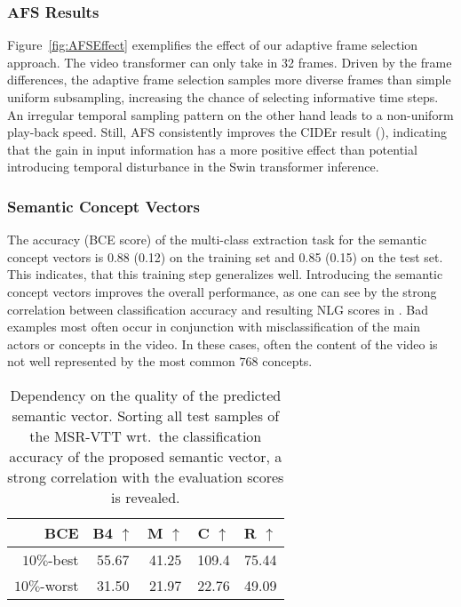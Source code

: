 \documentclass[runningheads,table]{llncs}
\begin{document}
\subsubsection{AFS Results}
Figure~\ref{fig:AFSEffect} exemplifies the effect of our adaptive frame selection approach. The video transformer can only take in 32 frames.
Driven by the frame differences, the adaptive frame selection samples more diverse frames than simple uniform subsampling, increasing the chance of selecting informative time steps. 
An irregular temporal sampling pattern on the other hand leads to a non-uniform play-back speed.  
Still, AFS consistently improves the CIDEr result (), indicating that the gain in input information has a more positive effect than potential introducing temporal disturbance in the Swin transformer inference.


\subsubsection{Semantic Concept Vectors}
The accuracy (BCE score) of the multi-class extraction task for the semantic concept vectors is 0.88 (0.12) on the training set and 0.85 (0.15) on the test set. This indicates, that this training step generalizes well. Introducing the semantic concept vectors improves the overall performance, as one can see by the strong correlation between classification accuracy and resulting NLG scores in .
Bad examples most often occur in conjunction with misclassification of the main actors or concepts in the video. 
In these cases, often the content of the video is not well represented by the most common $768$ concepts.

\begin{table*}[tb]
\centering
        \begin{tabular}{rcccc}
  \toprule
      BCE                                  & B4 $\uparrow$                      & M $\uparrow$                  & C $\uparrow$          & R $\uparrow$   
                  \\
            \midrule
        $10\%$-best & 55.67 & 41.25& 109.4& 75.44      \\
        
         $10\%$-worst & 31.50 & 21.97& 22.76& 49.09
        \\
          \bottomrule
        \end{tabular}
    \caption{Dependency on the quality of the predicted semantic vector. Sorting all test samples of the MSR-VTT wrt.\ the classification accuracy of the proposed semantic vector, a strong correlation with the evaluation scores is revealed.}\label{tab:ablations_sman}
\end{table*}
\end{document}

